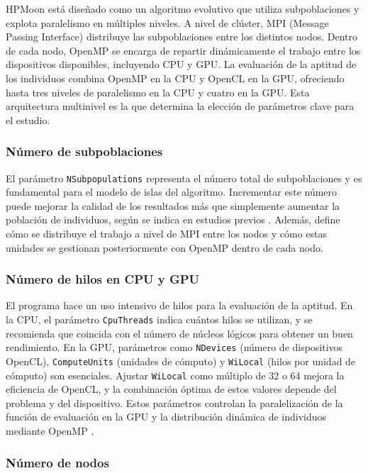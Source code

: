 HPMoon está diseñado como un algoritmo evolutivo que utiliza subpoblaciones y explota paralelismo en múltiples niveles. A nivel de clúster, MPI (Message Passing Interface) distribuye las subpoblaciones entre los distintos nodos. Dentro de cada nodo, OpenMP se encarga de repartir dinámicamente el trabajo entre los dispositivos disponibles, incluyendo CPU y GPU. La evaluación de la aptitud de los individuos combina OpenMP en la CPU y OpenCL en la GPU, ofreciendo hasta tres niveles de paralelismo en la CPU y cuatro en la GPU. Esta arquitectura multinivel es la que determina la elección de parámetros clave para el estudio.

\subsubsection{Número de subpoblaciones}

El parámetro \texttt{NSubpopulations} representa el número total de subpoblaciones y es fundamental para el modelo de islas del algoritmo. Incrementar este número puede mejorar la calidad de los resultados más que simplemente aumentar la población de individuos, según se indica en estudios previos \cite{escobar2020energy}. Además, define cómo se distribuye el trabajo a nivel de MPI entre los nodos y cómo estas unidades se gestionan posteriormente con OpenMP dentro de cada nodo.

\subsubsection{Número de hilos en CPU y GPU}

El programa hace un uso intensivo de hilos para la evaluación de la aptitud. En la CPU, el parámetro \texttt{CpuThreads} indica cuántos hilos se utilizan, y se recomienda que coincida con el número de núcleos lógicos para obtener un buen rendimiento. En la GPU, parámetros como \texttt{NDevices} (número de dispositivos OpenCL), \texttt{ComputeUnits} (unidades de cómputo) y \texttt{WiLocal} (hilos por unidad de cómputo) son esenciales. Ajustar \texttt{WiLocal} como múltiplo de 32 o 64 mejora la eficiencia de OpenCL, y la combinación óptima de estos valores depende del problema y del dispositivo. Estos parámetros controlan la paralelización de la función de evaluación en la GPU y la distribución dinámica de individuos mediante OpenMP \cite{escobar2020energy}.

\subsubsection{Número de nodos}

